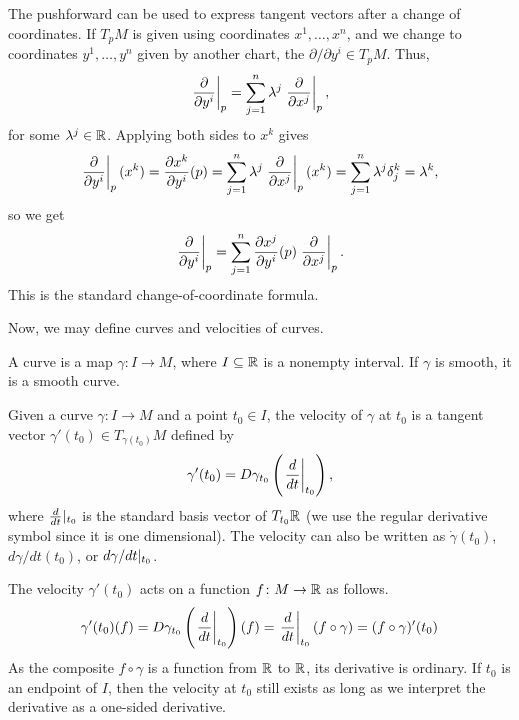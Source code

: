 \documentclass[a4paper,12pt]{article}
\begin{document}
The pushforward can be used to express tangent vectors after a change of coordinates.
If $T_p M$ is given using coordinates $x^1, \ldots, x^n$, and we change to coordinates $y^1, \ldots, y^n$ given by another chart, the $\partial/\partial y^i \in T_p M$.
Thus,
\begin{equation*}
    \eval{\frac{\partial}{\partial y^i}}{p} = \sum_{j=1}^n \lambda^j \eval{\frac{\partial}{\partial x^j}}{p},
\end{equation*}
for some $\lambda^j \in \mathbb{R}$.
Applying both sides to $x^k$ gives
\begin{equation*}
    \eval{\frac{\partial}{\partial y^i}}{p}(x^k) = \frac{\partial x^k}{\partial y^i}(p) = \sum_{j=1}^n \lambda^j \eval{\frac{\partial}{\partial x^j}}{p} (x^k) = \sum_{j=1}^n \lambda^j \delta^k_j = \lambda^k,
\end{equation*}
so we get
\begin{equation}
    \eval{\frac{\partial}{\partial y^i}}{p} = \sum_{j=1}^n \frac{\partial x^j}{\partial y^i}(p) \eval{\frac{\partial}{\partial x^j}}{p}.
\end{equation}
This is the standard change-of-coordinate formula.

Now, we may define curves and velocities of curves.
\begin{definition}[Curve]\label{def:curve}
    A curve is a map $\gamma \colon I \to M$, where $I \subseteq \mathbb{R}$ is a nonempty interval.
    If $\gamma$ is smooth, it is a smooth curve.
\end{definition}
\begin{definition}\label{def:derivative_of_curve}
    Given a curve $\gamma \colon I \to M$ and a point $t_0 \in I$, the velocity of $\gamma$ at $t_0$ is a tangent vector $\gamma'(t_0) \in T_{\gamma(t_0)} M$ defined by
    \begin{equation}
        \gamma'(t_0) = D\gamma_{t_0} \left(\eval{\frac{d}{dt}}{t_0}\right),
    \end{equation}
    where $\eval*{\frac{d}{dt}}{t_0}$ is the standard basis vector of $T_{t_0} \mathbb{R}$ (we use the regular derivative symbol since it is one dimensional).
    The velocity can also be written as $\dot{\gamma}(t_0)$, $d\gamma/dt(t_0)$, or $\eval*{d\gamma/dt}{t_0}$.
\end{definition}
The velocity $\gamma'(t_0)$ acts on a function $f \colon M \to \mathbb{R}$ as follows.
\begin{equation}
    \gamma'(t_0)(f) = D\gamma_{t_0} \left(\eval{\frac{d}{dt}}{t_0}\right)(f) = \eval{\frac{d}{dt}}{t_0} (f \circ \gamma) = (f \circ \gamma)'(t_0)
\end{equation}
As the composite $f \circ \gamma$ is a function from $\mathbb{R}$ to $\mathbb{R}$, its derivative is ordinary.
If $t_0$ is an endpoint of $I$, then the velocity at $t_0$ still exists as long as we interpret the derivative as a one-sided derivative.
\end{document}
